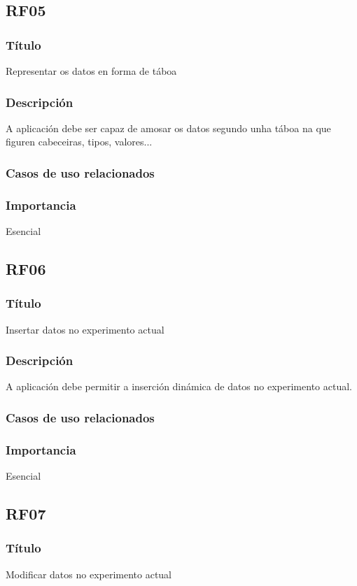\subsection*{RF05}
\subsubsection{Título}
Representar os datos en forma de táboa
\subsubsection{Descripción}
A aplicación debe ser capaz de amosar os datos segundo unha táboa na que figuren cabeceiras, tipos, valores...
\subsubsection{Casos de uso relacionados}
\subsubsection{Importancia}
Esencial

\subsection*{RF06}
\subsubsection{Título}
Insertar datos no experimento actual
\subsubsection{Descripción}
A aplicación debe permitir a inserción dinámica de datos no experimento actual.
\subsubsection{Casos de uso relacionados}
\subsubsection{Importancia}
Esencial

\subsection*{RF07}
\subsubsection{Título}
Modificar datos no experimento actual
